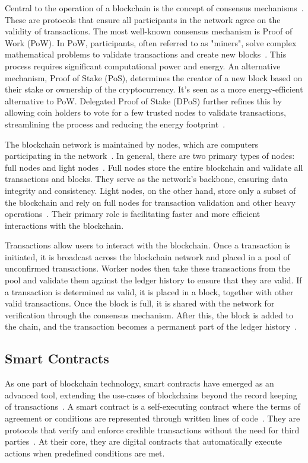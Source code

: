 Central to the operation of a blockchain is the concept of consensus mechanisms~\cite{Tahir.2022}. These are protocols that ensure all participants in the network agree on the validity of transactions. The most well-known consensus mechanism is Proof of Work (PoW). In PoW, participants, often referred to as "miners", solve complex mathematical problems to validate transactions and create new blocks~\cite{Kairaldeen.2021}. This process requires significant computational power and energy. An alternative mechanism, Proof of Stake (PoS), determines the creator of a new block based on their stake or ownership of the cryptocurrency. It's seen as a more energy-efficient alternative to PoW. Delegated Proof of Stake (DPoS) further refines this by allowing coin holders to vote for a few trusted nodes to validate transactions, streamlining the process and reducing the energy footprint~\cite{KUCHKOVSKY.2021}.

The blockchain network is maintained by nodes, which are computers participating in the network~\cite{Xiong.2022}. In general, there are two primary types of nodes: full nodes and light nodes~\cite{Mitra.2021}. Full nodes store the entire blockchain and validate all transactions and blocks. They serve as the network's backbone, ensuring data integrity and consistency. Light nodes, on the other hand, store only a subset of the blockchain and rely on full nodes for transaction validation and other heavy operations~\cite{Mitra.2021}. Their primary role is facilitating faster and more efficient interactions with the blockchain.

Transactions allow users to interact with the blockchain. Once a transaction is initiated, it is broadcast across the blockchain network and placed in a pool of unconfirmed transactions. Worker nodes then take these transactions from the pool and validate them against the ledger history to ensure that they are valid. If a transaction is determined as valid, it is placed in a block, together with other valid transactions. Once the block is full, it is shared with the network for verification through the consensus mechanism. After this, the block is added to the chain, and the transaction becomes a permanent part of the ledger history~\cite{Xiong.2022}.

\subsection{Smart Contracts}
As one part of blockchain technology, smart contracts have emerged as an advanced tool, extending the use-cases of blockchains beyond the record keeping of transactions~\cite{UchaniGutierrez.2023}. A smart contract is a self-executing contract where the terms of agreement or conditions are represented through written lines of code~\cite{Zhou.2022}. They are protocols that verify and enforce credible transactions without the need for third parties~\cite{Zhou.2022}. At their core, they are digital contracts that automatically execute actions when predefined conditions are met.

